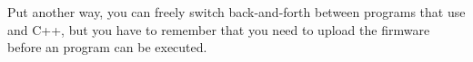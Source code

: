 Put another way, you can freely switch back-and-forth between programs that use \occam and C++, but you have to remember that you need to upload the firmware before an \occam program can be executed.


